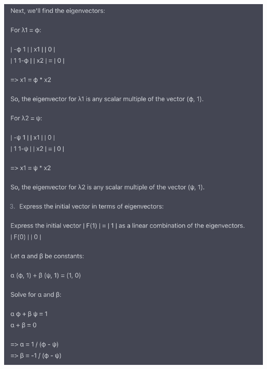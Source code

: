 \begin{mdframed}
\includegraphics[width=400pt]{img/linear-algebra--vector-spaces-and-fields--computing-the-n-th-fibonacci-number-generating-function-03cb.png}
\end{mdframed}

